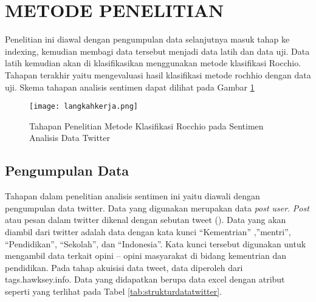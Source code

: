 
\section*{METODE PENELITIAN}

Penelitian ini diawal dengan pengumpulan data selanjutnya masuk tahap ke indexing, kemudian membagi data tersebut menjadi data latih dan data uji. Data latih kemudian akan di klasifikasikan menggunakan metode klasifikasi Rocchio. Tahapan terakhir yaitu mengevaluasi hasil klasifikasi metode rochhio dengan data uji. Skema tahapan analisis sentimen dapat dilihat pada Gambar \ref{fig:tahapan} 

\begin{figure}[h!] %
	\centering
	\texttt{[image: langkahkerja.png]}
	\caption{Tahapan Penelitian Metode Klasifikasi Rocchio pada Sentimen Analisis Data Twitter}
	\label{fig:tahapan}
\end{figure}

\subsection*{Pengumpulan Data}
Tahapan dalam penelitian analisis sentimen ini yaitu diawali dengan pengumpulan data twitter. Data yang digunakan merupakan data \textit{post user}. \textit{Post} atau pesan dalam twitter dikenal dengan sebutan tweet (\cite{ZHANG2011}). Data yang akan diambil dari twitter adalah data dengan kata kunci “Kementrian” ,”mentri”, “Pendidikan”, “Sekolah”, dan “Indonesia”. Kata kunci tersebut digunakan  untuk mengambil data terkait opini – opini masyarakat di bidang kementrian dan pendidikan. Pada tahap akuisisi data tweet, data diperoleh dari tags.hawksey.info. Data yang didapatkan berupa data excel dengan atribut seperti yang terlihat pada Tabel \ref{tab:strukturdatatwitter}.

